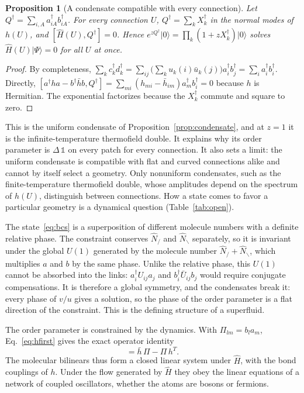 \documentclass[reprint,aps,prd,amsmath,amssymb,superscriptaddress,nofootinbib,floatfix]{revtex4-2}
\theoremstyle{plain}
\newtheorem{proposition}{Proposition}
\theoremstyle{definition}
\theoremstyle{remark}
\newcommand{\Lat}{\ensuremath{/}}                 %
\newcommand{\Rat}{\ensuremath{\backslash}}        %
\newcommand{\Mol}{\ensuremath{X}}                 %
\newcommand{\ket}[1]{\ensuremath{|#1\rangle}}
\newcommand{\Hc}{\hat{H}}
\newcommand{\one}{\mathbb{1}}
\begin{document}
\begin{proposition}[A condensate compatible with every connection]
\label{prop:blind}
Let $Q^\dagger=\sum_{i,A}a^\dagger_{iA}b^\dagger_{iA}$. For every connection $U$, $Q^\dagger=\sum_k\Mol^\dagger_k$ in the normal modes of $h(U)$, and
$[\Hc(U),Q^\dagger]=0$. Hence $e^{zQ^\dagger}\ket0=\prod_k(1+z\Mol^\dagger_k)\ket0$ solves $\Hc(U)\ket\Psi=0$ for all $U$ at once.
\end{proposition}
\begin{proof}
By completeness, $\sum_kc^\dagger_kd^\dagger_k=\sum_{ij}\big(\sum_ku_k(i)\bar u_k(j)\big)a^\dagger_ib^\dagger_j=\sum_ia^\dagger_ib^\dagger_i$. Directly,
$[a^\dagger ha-b^\dagger\bar hb,Q^\dagger]=\sum_{mi}(h_{mi}-\bar h_{im})a^\dagger_mb^\dagger_i=0$ because $h$ is Hermitian. The exponential factorizes
because the $\Mol^\dagger_k$ commute and square to zero.
\end{proof}
This is the uniform condensate of Proposition~\ref{prop:condensate}, and at $z=1$ it is the infinite-temperature thermofield
double. It explains why its order parameter is $\Delta\,\one$ on every patch for every connection. It also sets a limit: the
uniform condensate is compatible with flat and curved connections alike and cannot by itself select a geometry. Only
nonuniform condensates, such as the finite-temperature thermofield double, whose amplitudes depend on the spectrum of
$h(U)$, distinguish between connections. How a state comes to favor a particular geometry is a dynamical question
(Table~\ref{tab:open}).

The state~\eqref{eq:bcs} is a superposition of different molecule numbers with a definite relative phase. The
constraint conserves $\hat N_\Lat$ and $\hat N_\Rat$ separately, so it is invariant under the global $U(1)$ generated by the
molecule number $\hat N_\Lat+\hat N_\Rat$, which multiplies $a$ and $b$ by the same phase. Unlike the relative phase, this $U(1)$
cannot be absorbed into the links: $a^\dagger_iU_{ij}a_j$ and $b^\dagger_i\bar U_{ij}b_j$ would require conjugate compensations. It is
therefore a global symmetry, and the condensates break it: every phase of $v/u$ gives a solution, so the phase of the
order parameter is a flat direction of the constraint. This is the defining structure of a superfluid.

The order parameter is constrained by the dynamics. With $\Pi_{lm}=b_la_m$, Eq.~\eqref{eq:hfirst} gives the exact operator identity
\begin{equation}
[\Hc,\Pi]=\bar h\,\Pi-\Pi\,h^{T} .
\label{eq:fieldeq_op}
\end{equation}
The molecular bilinears thus form a closed linear system under $\Hc$, with the bond couplings of $h$. Under the flow
generated by $\Hc$ they obey the linear equations of a network of coupled oscillators, whether the atoms are bosons or fermions.
\end{document}
